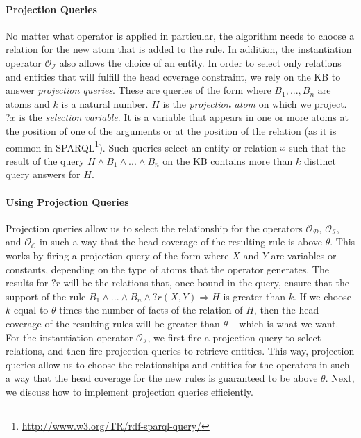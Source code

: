 \paragraph{Projection Queries} 
No matter what operator is applied in particular, the algorithm needs to choose a relation for the new atom that is added to the rule. In addition, 
the instantiation operator $\mathcal{O_I}$ also allows the choice of an entity. In order to select only relations and entities that will fulfill the head coverage constraint, we rely on the KB to answer \emph{projection queries}. These are queries of the form
where $B_1, ..., B_n$ are atoms and $k$ is a natural number. $H$ is the \emph{projection atom} on which we project. $?x$ is the \emph{selection variable}. It is a variable that appears in one or more atoms at the position of one of the arguments or at the position of the relation (as it is common in SPARQL\footnote{\url{http://www.w3.org/TR/rdf-sparql-query/}}). Such queries select an entity or relation $x$ such that the result of the query $H \wedge B_1 \wedge ... \wedge B_n$ on the KB contains more than $k$ distinct query answers for $H$.

\paragraph{Using Projection Queries} Projection queries allow us to select the relationship for the operators $\mathcal{O_D}$, $\mathcal{O_I}$, and $\mathcal{O_C}$ in such a way that the head coverage of the resulting rule is above $\theta$. 
 This works by firing a projection query of the form
where $X$ and $Y$ are variables or constants, depending on the type of atoms that the operator generates. The results for $?r$ will be the relations that, once bound in the query, ensure that the support of the rule $B_1 \wedge ... \wedge B_n \wedge ?r(X,Y) \Rightarrow H$ is greater than $k$.
If we choose $k$ equal to $\theta$ times the number of facts of the relation of $H$, then the head coverage of the resulting rules will be greater than $\theta$ -- which is what we want.
For the instantiation operator $\mathcal{O_I}$, we first fire a projection query to select relations, and then fire projection queries to retrieve entities.
This way, projection queries allow us to choose the relationships and entities for the operators in such a way that the head coverage for the new rules is guaranteed to be above $\theta$.
Next, we discuss how to implement projection queries efficiently. 


